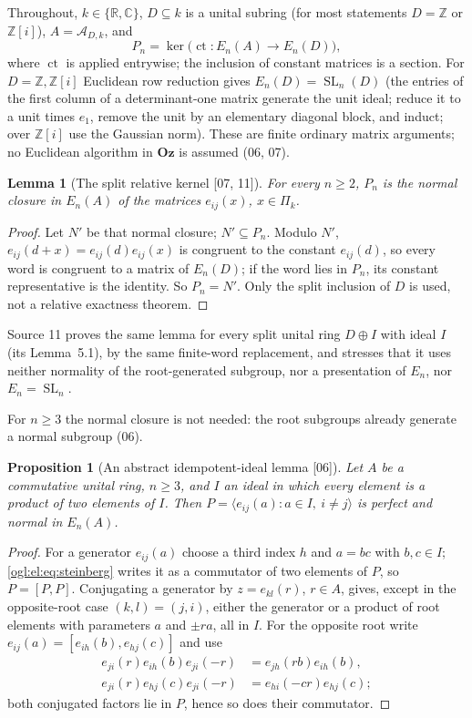 \documentclass[11pt,oneside]{article}
\numberwithin{equation}{section}
\newtheorem{proposition}[proposition]{Proposition}
\newtheorem{lemma}[lemma]{Lemma}
\theoremstyle{definition}
\theoremstyle{remark}
\newcommand{\Oz}{\mathbf{Oz}}
\newcommand{\Z}{\mathbb Z}
\newcommand{\R}{\mathbb R}
\newcommand{\C}{\mathbb C}
\newcommand{\A}{\mathcal A}
\newcommand{\ct}{\operatorname{ct}}
\newcommand{\SL}{\operatorname{SL}}
\newcommand{\src}[1]{\textup{\textsf{\small[#1]}}}
\begin{document}
Throughout, $k\in\{\R,\C\}$, $D\subseteq k$ is a unital subring (for most
statements $D=\Z$ or $\Z[i]$), $A=\A_{D,k}$, and
\begin{equation}\label{ogl:el:eq:kernel}
 P_n=\ker\bigl(\ct:E_n(A)\to E_n(D)\bigr),
\end{equation}
where $\ct$ is applied entrywise; the inclusion of constant matrices is a
section. For $D=\Z,\Z[i]$ Euclidean row reduction gives $E_n(D)=\SL_n(D)$ (the
entries of the first column of a determinant-one matrix generate the unit
ideal; reduce it to a unit times $e_1$, remove the unit by an elementary
diagonal block, and induct; over $\Z[i]$ use the Gaussian norm). These are
finite ordinary matrix arguments; no Euclidean algorithm in $\Oz$ is assumed
(06, 07).

\begin{lemma}[The split relative kernel \src{07, 11}]\label{ogl:el:lem:normalgen}
For every $n\ge2$, $P_n$ is the normal closure in $E_n(A)$ of the matrices
$e_{ij}(x)$, $x\in\Pi_k$.
\end{lemma}
\begin{proof}
Let $N'$ be that normal closure; $N'\subseteq P_n$. Modulo $N'$,
$e_{ij}(d+x)=e_{ij}(d)e_{ij}(x)$ is congruent to the constant $e_{ij}(d)$, so
every word is congruent to a matrix of $E_n(D)$; if the word lies in $P_n$, its
constant representative is the identity. So $P_n=N'$. Only the split inclusion
of $D$ is used, not a relative exactness theorem.
\end{proof}

Source 11 proves the same lemma for every split unital ring $D\oplus I$ with
ideal $I$ (its Lemma~5.1), by the same finite-word replacement, and stresses
that it uses neither normality of the root-generated subgroup, nor a
presentation of $E_n$, nor $E_n=\SL_n$.

For $n\ge3$ the normal closure is not needed: the root subgroups already
generate a normal subgroup (06).

\begin{proposition}[An abstract idempotent-ideal lemma \src{06}]\label{ogl:el:prop:normal}
Let $A$ be a commutative unital ring, $n\ge3$, and $I$ an ideal in which every
element is a product of two elements of $I$. Then
$P=\langle e_{ij}(a):a\in I,\ i\ne j\rangle$ is perfect and normal in $E_n(A)$.
\end{proposition}
\begin{proof}
For a generator $e_{ij}(a)$ choose a third index $h$ and $a=bc$ with
$b,c\in I$; \eqref{ogl:el:eq:steinberg} writes it as a commutator of two
elements of $P$, so $P=[P,P]$. Conjugating a generator by $z=e_{kl}(r)$,
$r\in A$, gives, except in the opposite-root case $(k,l)=(j,i)$, either the
generator or a product of root elements with parameters $a$ and $\pm ra$, all
in $I$. For the opposite root write $e_{ij}(a)=[e_{ih}(b),e_{hj}(c)]$ and use
\begin{align}
 e_{ji}(r)e_{ih}(b)e_{ji}(-r)&=e_{jh}(rb)e_{ih}(b),\label{ogl:el:eq:conjone}\\
 e_{ji}(r)e_{hj}(c)e_{ji}(-r)&=e_{hi}(-cr)e_{hj}(c);\label{ogl:el:eq:conjtwo}
\end{align}
both conjugated factors lie in $P$, hence so does their commutator.
\end{proof}
\end{document}
